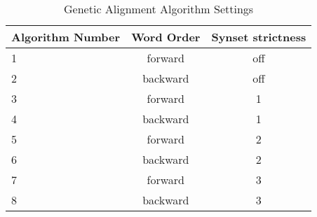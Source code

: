 \begin{table}[center]
	\centering
	\begin{tabular} {|l | c | c |}
		\hline	\textbf{Algorithm Number} & \textbf{Word Order} & \textbf{Synset strictness}\\
		\hline	1	&	forward		&	off	\\
		\hline	2	&	backward	&	off	\\
		\hline	3	&	forward		&	1	\\
		\hline	4	&	backward	&	1	\\
		\hline	5	&	forward		&	2	\\
		\hline	6	&	backward	&	2	\\
		\hline	7	&	forward		&	3	\\
		\hline	8	&	backward	&	3	\\ \hline
	\end{tabular}
	\caption{Genetic Alignment Algorithm Settings}
	\label{tab:settings}
\end{table}
